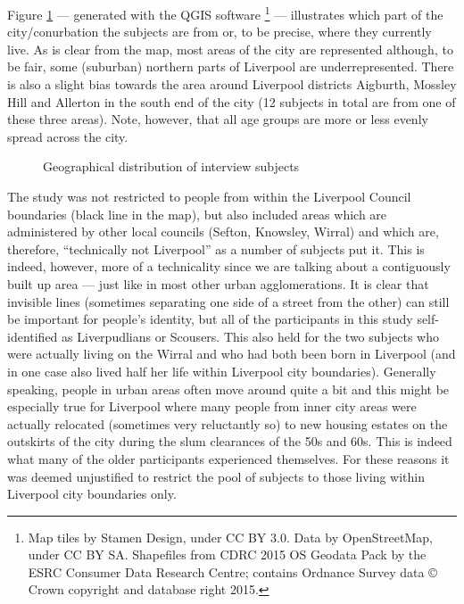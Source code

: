 Figure \ref{fig.map.participants} --- generated with the QGIS software \parencite{QGIS2016}\footnote{Map tiles by Stamen Design, under CC BY 3.0. Data by OpenStreetMap, under CC BY SA. Shapefiles from CDRC 2015 OS Geodata Pack by the ESRC Consumer Data Research Centre; contains Ordnance Survey data © Crown copyright and database right 2015.} --- illustrates which part of the city/conurbation the subjects are from or, to be precise, where they currently live. As is clear from the map, most areas of the city are represented although, to be fair, some (suburban) northern parts of Liverpool are underrepresented. There is also a slight bias towards the area around Liverpool districts Aigburth, Mossley Hill and Allerton in the south end of the city (12 subjects in total are from one of these three areas). Note, however, that all age groups are more or less evenly spread across the city.

	\begin{figure}[h]
		\centering
		\caption{Geographical distribution of interview subjects}\label{fig.map.participants}
	\end{figure}

The study was not restricted to people from within the Liverpool Council boundaries (black line in the map), but also included areas which are administered by other local councils (Sefton, Knowsley, Wirral) and which are, therefore, ``technically not Liverpool'' as a number of subjects put it. This is indeed, however, more of a technicality since we are talking about a contiguously built up area --- just like in most other urban agglomerations. It is clear that invisible lines (sometimes separating one side of a street from the other) can still be important for people's identity, but all of the participants in this study self-identified as Liverpudlians or Scousers. This also held for the two subjects who were actually living on the Wirral and who had both been born in Liverpool (and in one case also lived half her life within Liverpool city boundaries). Generally speaking, people in urban areas often move around quite a bit and this might be especially true for Liverpool where many people from inner city areas were actually relocated (sometimes very reluctantly so) to new housing estates on the outskirts of the city during the slum clearances of the 50s and 60s. This is indeed what many of the older participants experienced themselves. For these reasons it was deemed unjustified to restrict the pool of subjects to those living within Liverpool city boundaries only.


